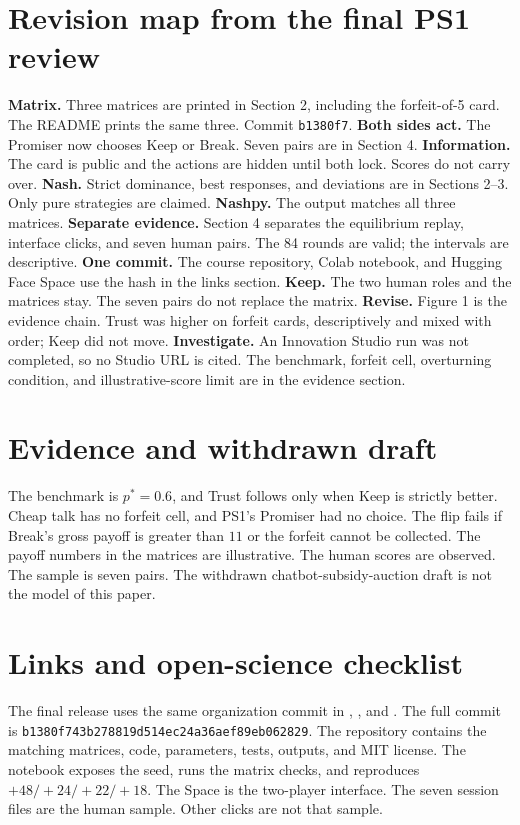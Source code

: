 \section{Revision map from the final PS1 review}
\textbf{Matrix.} Three matrices are printed in Section 2, including the forfeit-of-5 card. The README prints the same three. Commit \texttt{b1380f7}. \textbf{Both sides act.} The Promiser now chooses Keep or Break. Seven pairs are in Section 4. \textbf{Information.} The card is public and the actions are hidden until both lock. Scores do not carry over. \textbf{Nash.} Strict dominance, best responses, and deviations are in Sections 2--3. Only pure strategies are claimed. \textbf{Nashpy.} The output matches all three matrices. \textbf{Separate evidence.} Section 4 separates the equilibrium replay, interface clicks, and seven human pairs. The 84 rounds are valid; the intervals are descriptive. \textbf{One commit.} The course repository, Colab notebook, and Hugging Face Space use the hash in the links section. \textbf{Keep.} The two human roles and the matrices stay. The seven pairs do not replace the matrix. \textbf{Revise.} Figure 1 is the evidence chain. Trust was higher on forfeit cards, descriptively and mixed with order; Keep did not move. \textbf{Investigate.} An Innovation Studio run was not completed, so no Studio URL is cited. The benchmark, forfeit cell, overturning condition, and illustrative-score limit are in the evidence section.

\section{Evidence and withdrawn draft}
The benchmark is $p^\ast=0.6$, and Trust follows only when Keep is strictly better. Cheap talk has no forfeit cell, and PS1's Promiser had no choice. The flip fails if Break's gross payoff is greater than $11$ or the forfeit cannot be collected. The payoff numbers in the matrices are illustrative. The human scores are observed. The sample is seven pairs. The withdrawn chatbot-subsidy-auction draft is not the model of this paper.

\section{Links and open-science checklist}
The final release uses the same organization commit in \GitHubLink, \NotebookLink, and \HuggingFaceLink. The full commit is \texttt{b1380f743b278819d514ec24a36aef89eb062829}. The repository contains the matching matrices, code, parameters, tests, outputs, and MIT license. The notebook exposes the seed, runs the matrix checks, and reproduces $+48/+24/+22/+18$. The Space is the two-player interface. The seven session files are the human sample. Other clicks are not that sample.

